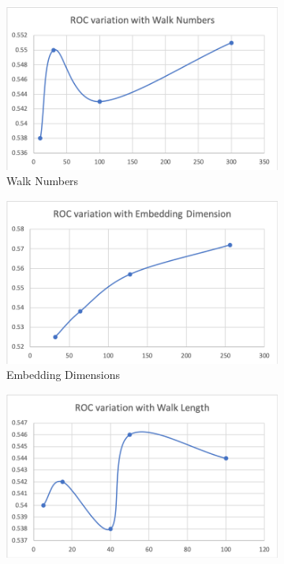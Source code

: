 \documentclass[sigconf]{acmart}
\begin{document}
\begin{figure}[h]
  \centering
  \begin{subfigure}[b]{0.49\linewidth}
    \includegraphics[width=\linewidth]{Images/Picture 1.1.png}
    \caption{Walk Numbers}
  \end{subfigure}
  \begin{subfigure}[b]{0.49\linewidth}
    \includegraphics[width=\linewidth]{Images/Picture 1.2.png}
    \caption{Embedding Dimensions}
  \end{subfigure}
  \begin{subfigure}[b]{0.49\linewidth}
    \includegraphics[width=\linewidth]{Images/Picture 1.3.png}

\end{subfigure}
\end{figure}
\end{document}
